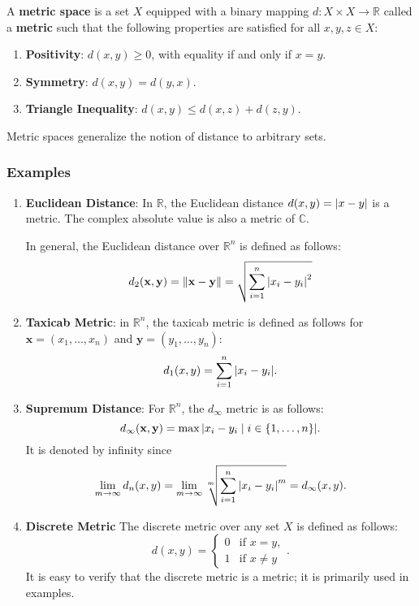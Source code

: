\documentclass[11pt]{article}
\renewcommand{\vec}[1]{\mathbf{#1}}
\begin{document}
A \textbf{metric space} is a set $X$ equipped with a binary mapping $d : X \times X \to \mathbb{R}$ called a \textbf{metric} such that the following properties are satisfied for all $x, y, z \in X$:
\begin{enumerate}
	\item \textbf{Positivity}: $d(x, y) \ge 0$, with equality if and only if $x = y$.
	\item \textbf{Symmetry}: $d(x, y) = d(y, x)$.
	\item \textbf{Triangle Inequality}: $d(x, y) \le d(x, z) + d(z, y)$.
\end{enumerate}
Metric spaces generalize the notion of distance to arbitrary sets. 


\subsubsection*{Examples}

\begin{enumerate}
	\item \textbf{Euclidean Distance}: In $\mathbb{R}$, the Euclidean distance $d(x, y) = \abs{x - y}$ is a metric. The complex absolute value is also a metric of $\mathbb{C}$.

	In general, the Euclidean distance over $\mathbb{R}^{n}$ is defined as follows: 
	\[
		d_{2}(\vec{x}, \vec{y}) = \norm{\vec{x} - \vec{y}} = \sqrt{\sum\limits_{i = 1}^{n} \abs{x_{i} - y_{i}}^{2}}
	\]
	\item \textbf{Taxicab Metric}: in $\mathbb{R}^{n}$, the taxicab metric is defined as follows for $\vec{x} = (x_{1}, \ldots, x_{n})$ and $\vec{y} = (y_{1}, \ldots, y_{n})$:
	\[
		d_{1}(x, y) = \sum\limits_{i = 1}^{n} \abs{x_{i} - y_{i}}.
	\]
	\item \textbf{Supremum Distance}: For $\mathbb{R}^{n}$, the $d_{\infty}$ metric is as follows:
	\[
		d_{\infty}(\vec{x}, \vec{y}) = \max \abs{x_{i} - y_{i} \mid i \in \{ 1, \ldots, n \}}.
	\]
	It is denoted by infinity since
	\[
		\lim\limits_{m \to \infty} d_{n}(x, y) = \lim\limits_{m \to \infty} \sqrt[m]{\sum\limits_{i = 1}^{n} \abs{x_{i} - y_{i}}^{m}} = d_{\infty}(x, y).
	\]
	\item \textbf{Discrete Metric} The discrete metric over any set $X$ is defined as follows:
	\[
		d(x, y) = 
		\begin{cases}
			0 & \text{if } x = y, \\
			1 & \text{if } x \ne y
		\end{cases}.
	\]
	It is easy to verify that the discrete metric is a metric; it is primarily used in examples. 
\end{enumerate}
\end{document}
